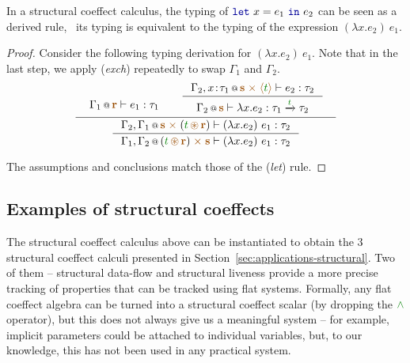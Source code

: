 \begin{remark}
\label{thm:structural-letbinding}
In a structural coeffect calculus, the typing of $\kvd{let}~x=e_1~\kvd{in}~e_2$ can be
seen as a derived rule, \ie~its typing is equivalent to the typing of the expression
$(\lambda x.e_2)~e_1$.

\end{remark}
\begin{proof}
Consider the following typing derivation for $(\lambda x.e_2)~e_1$. Note that 
in the last step, we apply (\emph{exch}) repeatedly to swap $\Gamma_1$ and $\Gamma_2$. 
%
\begin{equation*}
\inference
  { \begin{array}{l}\coctx{\Gamma_1}{\aclrd{\textbf{r}}} \vdash e_1 : \tau_1\vspace{-1.6em}\end{array} &
    \inference
      { \coctx{\Gamma_2, x\!:\!\tau_1}{\aclrd{\textbf{s}}\;\atimes\;\alift{\cclrd{t}}} \vdash e_2 : \tau_2 }
      { \coctx{\Gamma_2}{\aclrd{\textbf{s}}} \vdash \lambda x.e_2 : \tau_1 \xrightarrow{\cclrd{t}} \tau_2} \vspace{0.2em} }
  { \inference
      { \coctx{\Gamma_2, \Gamma_1}{\aclrd{\textbf{s}} \;\atimes\; (\cclrd{t} \,\aseq\, \aclrd{\textbf{r}})} \vdash (\lambda x.e_2)~e_1 : \tau_2 }
      { \coctx{\Gamma_1, \Gamma_2}{(\cclrd{t} \,\aseq\, \aclrd{\textbf{r}}) \;\atimes\;  \aclrd{\textbf{s}} } \vdash (\lambda x.e_2)~e_1 : \tau_2 } }
\end{equation*}

\noindent
The assumptions and conclusions match those of the (\emph{let}) rule. 
\end{proof}



\subsection{Examples of structural coeffects}

The structural coeffect calculus above can be instantiated to obtain the 3 structural coeffect calculi
presented in Section~\ref{sec:applications-structural}. Two of them -- structural data-flow and
structural liveness provide a more precise tracking of properties that can be tracked using 
flat systems. Formally, any flat coeffect algebra can be turned into a structural coeffect scalar
(by dropping the $\czip$ operator), but this does not always give us a meaningful system -- for
example, implicit parameters could be attached to individual variables, but, to our knowledge, this
has not been used in any practical system.

